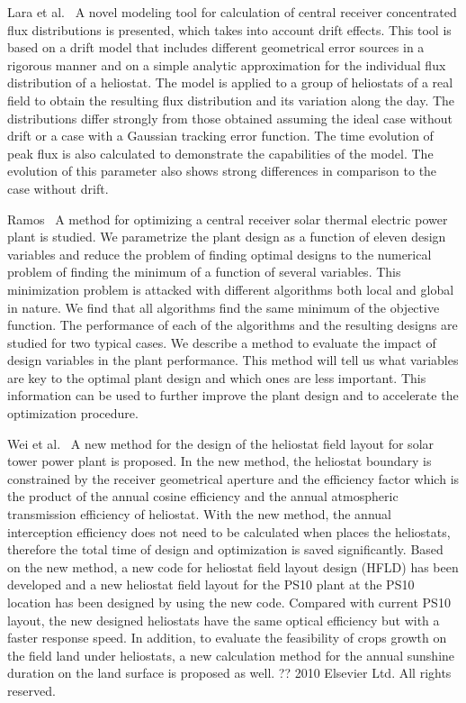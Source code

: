 Lara et al.~\cite{Lara2016} A novel modeling tool for calculation of central receiver concentrated flux distributions is presented, which takes into account drift effects. This tool is based on a drift model that includes different geometrical error sources in a rigorous manner and on a simple analytic approximation for the individual flux distribution of a heliostat. The model is applied to a group of heliostats of a real field to obtain the resulting flux distribution and its variation along the day. The distributions differ strongly from those obtained assuming the ideal case without drift or a case with a Gaussian tracking error function. The time evolution of peak flux is also calculated to demonstrate the capabilities of the model. The evolution of this parameter also shows strong differences in comparison to the case without drift.

Ramos~\cite{Ramos2012} A method for optimizing a central receiver solar thermal electric power plant is studied. We parametrize the plant design as a function of eleven design variables and reduce the problem of finding optimal designs to the numerical problem of finding the minimum of a function of several variables. This minimization problem is attacked with different algorithms both local and global in nature. We find that all algorithms find the same minimum of the objective function. The performance of each of the algorithms and the resulting designs are studied for two typical cases. We describe a method to evaluate the impact of design variables in the plant performance. This method will tell us what variables are key to the optimal plant design and which ones are less important. This information can be used to further improve the plant design and to accelerate the optimization procedure.

Wei et al.~\cite{Wei2010} A new method for the design of the heliostat field layout for solar tower power plant is proposed. In the new method, the heliostat boundary is constrained by the receiver geometrical aperture and the efficiency factor which is the product of the annual cosine efficiency and the annual atmospheric transmission efficiency of heliostat. With the new method, the annual interception efficiency does not need to be calculated when places the heliostats, therefore the total time of design and optimization is saved significantly. Based on the new method, a new code for heliostat field layout design (HFLD) has been developed and a new heliostat field layout for the PS10 plant at the PS10 location has been designed by using the new code. Compared with current PS10 layout, the new designed heliostats have the same optical efficiency but with a faster response speed. In addition, to evaluate the feasibility of crops growth on the field land under heliostats, a new calculation method for the annual sunshine duration on the land surface is proposed as well. ?? 2010 Elsevier Ltd. All rights reserved.

